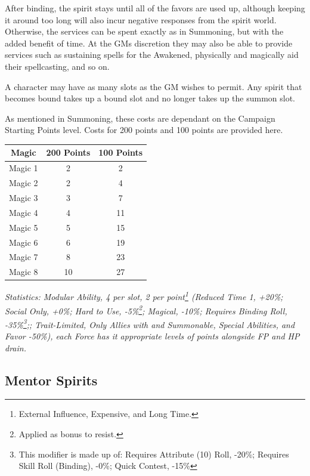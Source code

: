 \begin{multicols}{3}
	After binding, the spirit stays until all of the favors are used up, although keeping it around too long will also incur negative responses from the spirit world. Otherwise, the services can be spent exactly as in Summoning, but with the added benefit of time. At the GMs discretion they may also be able to provide services such as sustaining spells for the Awakened, physically and magically aid their spellcasting, and so on.
	
	A character may have as many slots as the GM wishes to permit. Any spirit that becomes bound takes up a bound slot and no longer takes up the summon slot.
	
	As mentioned in Summoning, these costs are dependant on the Campaign Starting Points level. Costs for 200 points and 100 points are provided here.
	
	\begin{center}
		\begin{tabular}{|c|c|c|}
			\hline
			Magic & 200 Points & 100 Points \\
			\hline
			\hline
			Magic 1 & 2 & 2 \\
			Magic 2 & 2 & 4 \\
			Magic 3 & 3 & 7 \\
			Magic 4 & 4 & 11 \\
			Magic 5 & 5 & 15 \\
			Magic 6 & 6 & 19 \\
			Magic 7 & 8 & 23 \\
			Magic 8 & 10 & 27 \\
			\hline
		\end{tabular}
	\end{center}
	
	\textit{\textcolor{OliveGreen}{Statistics: Modular Ability, 4 per slot, 2 per point\footnote{External Influence, Expensive, and Long Time.} (Reduced Time 1, +20\%; Social Only, +0\%; Hard to Use, -5\%\footnote{Applied as bonus to resist.}; Magical, -10\%; Requires Binding Roll, -35\%\footnote{This modifier is made up of: Requires Attribute (10) Roll, -20\%; Requires Skill Roll (Binding), -0\%; Quick Contest, -15\%};; Trait-Limited, Only Allies with and Summonable, Special Abilities, and Favor -50\%), each Force has it appropriate levels of points alongside FP and HP drain.}}
	
	\subsection{Mentor Spirits}
	

\end{multicols}
